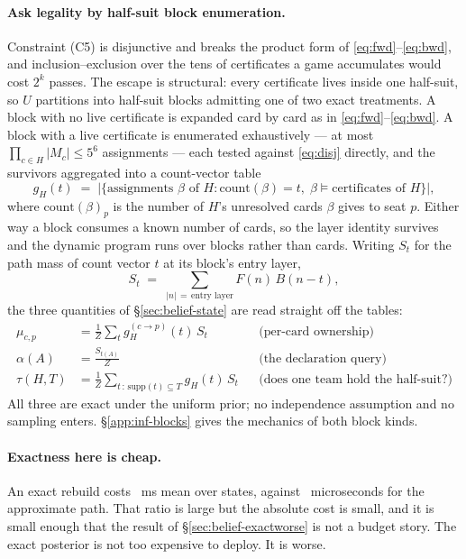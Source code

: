 \paragraph{Ask legality by half-suit block enumeration.} Constraint (C5) is
disjunctive and breaks the product form of \eqref{eq:fwd}--\eqref{eq:bwd}, and
inclusion--exclusion over the tens of certificates a game accumulates would cost
$2^k$ passes. The escape is structural: every certificate lives inside one
half-suit, so $U$ partitions into half-suit blocks admitting one of two exact
treatments. A block with no live certificate is expanded card by card as in
\eqref{eq:fwd}--\eqref{eq:bwd}. A block with a live certificate is enumerated
exhaustively --- at most $\prod_{c \in H}|M_c| \le 5^6$ assignments --- each
tested against \eqref{eq:disj} directly, and the survivors aggregated into a
count-vector table
\begin{equation}
  g_H(t) \;=\; \bigl|\{\text{assignments } \beta \text{ of } H :
    \mathrm{count}(\beta) = t,\; \beta \models \text{certificates of } H\}\bigr| ,
  \label{eq:blocktable}
\end{equation}
where $\mathrm{count}(\beta)_p$ is the number of $H$'s unresolved cards $\beta$
gives to seat $p$. Either way a block consumes a known number of cards, so the
layer identity survives and the dynamic program runs over blocks rather than
cards. Writing $S_t$ for the path mass of count vector $t$ at its block's entry
layer,
\begin{equation}
  S_t \;=\; \sum_{|n| \,=\, \text{entry layer}} F(n)\, B(n - t),
  \label{eq:pathmass}
\end{equation}
the three quantities of \S\ref{sec:belief-state} are read straight off the
tables:
\begin{align}
  \mu_{c,p} &= \frac{1}{Z}\sum_t g_H^{(c \to p)}(t)\, S_t
  &&\text{(per-card ownership)} \label{eq:q1}\\
  \alpha(A) &= \frac{S_{t(A)}}{Z}
  &&\text{(the declaration query)} \label{eq:q2}\\
  \tau(H,T) &= \frac{1}{Z}\sum_{t \,:\, \mathrm{supp}(t) \subseteq T} g_H(t)\, S_t
  &&\text{(does one team hold the half-suit?)} \label{eq:q3}
\end{align}
All three are exact under the uniform prior; no independence assumption and no
sampling enters. \S\ref{app:inf-blocks} gives the mechanics of both block kinds.

\paragraph{Exactness here is cheap.} An exact rebuild costs \vsixCountCost{}~ms
mean over \vsixCountStates{} states, against \vsixSinkhornCost{}~microseconds for
the approximate path. That ratio is large but the absolute cost is small, and it
is small enough that the result of \S\ref{sec:belief-exactworse} is not a budget
story. The exact posterior is not too expensive to deploy. It is worse.


